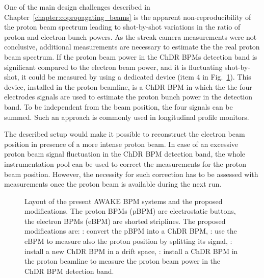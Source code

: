 One of the main design challenges described in Chapter~\ref{chapter:copropagating_beams} is the apparent non-reproducibility of the proton beam spectrum leading to shot-by-shot variations in the ratio of proton and electron bunch powers. As the streak camera measurements were not conclusive, additional measurements are necessary to estimate the the real proton beam spectrum. If the proton beam power in the ChDR BPMs detection band is significant compared to the electron beam power, and it is fluctuating shot-by-shot, it could be measured by using a dedicated device (item 4 in Fig.~\ref{fig:awake_layout_fd}). This device, installed in the proton beamline, is a ChDR BPM in which the the four electrodes signals are used to estimate the proton bunch power in the detection band. To be independent from the beam position, the four signals can be summed. Such an approach is commonly used in longitudinal profile monitors. 

The described setup would make it possible to reconstruct the electron beam position in presence of a more intense proton beam. In case of an excessive proton beam signal fluctuation in the ChDR BPM detection band, the whole instrumentation pool can be used to correct the measurements for the proton beam position. However, the necessity for such correction has to be assessed with measurements once the proton beam is available during the next run.


\clearpage
\begin{landscape}
\begin{figure}
\centering


\caption{Layout of the present AWAKE BPM systems and the proposed modifications. The proton BPMs (pBPM) are electrostatic buttons, the electron BPMs (eBPM) are shorted striplines. The proposed modifications are: : convert the pBPM into a ChDR BPM, : use the eBPM to measure also the proton position by splitting its signal, : install a new ChDR BPM in a drift space, : install a ChDR BPM in the proton beamline to measure the proton beam power in the ChDR BPM detection band.}
\label{fig:awake_layout_fd}
\end{figure}
\end{landscape}














